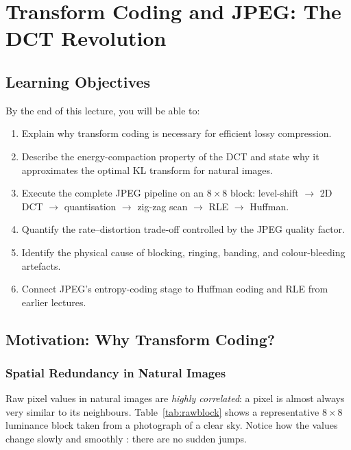 \section{Transform Coding and JPEG: The DCT Revolution}

\subsection{Learning Objectives}

By the end of this lecture, you will be able to:
\begin{enumerate}[leftmargin=*, nosep]
    \item Explain why transform coding is necessary for efficient lossy compression.
    \item Describe the energy-compaction property of the DCT and state why it approximates the optimal KL transform for natural images.
    \item Execute the complete JPEG pipeline on an $8\times8$ block: level-shift $\to$ 2D DCT $\to$ quantisation $\to$ zig-zag scan $\to$ RLE $\to$ Huffman.
    \item Quantify the rate–distortion trade-off controlled by the JPEG quality factor.
    \item Identify the physical cause of blocking, ringing, banding, and colour-bleeding artefacts.
    \item Connect JPEG's entropy-coding stage to Huffman coding and RLE from earlier lectures.
\end{enumerate}

\subsection{Motivation: Why Transform Coding?}

\subsubsection{Spatial Redundancy in Natural Images}

Raw pixel values in natural images are \emph{highly correlated}: a pixel is almost always very similar to its neighbours. Table~\ref{tab:rawblock} shows a representative $8\times8$ luminance block taken from a photograph of a clear sky. Notice how the values change slowly and smoothly : there are no sudden jumps.

